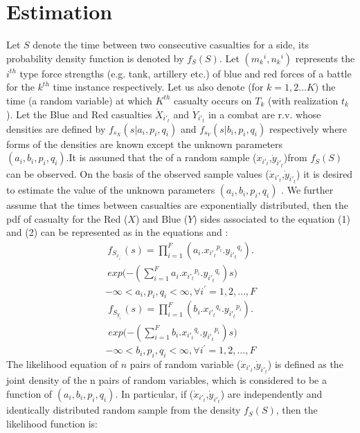 \documentclass[]{article}
\begin{document}
\section{Estimation}
Let $S$ denote the time between two consecutive casualties for a side, its probability density function is denoted by $f_S(S)$. Let $({m_k}^i,{n_k}^i)$  represents the ${i}^{th}$ type force strengths (e.g. tank, artillery etc.) of blue and red forces of a battle for the ${k}^{th}$ time instance respectively. Let us also denote (for $k=1,2\dots K$) the time (a random variable) at which $K^{th}$ casualty occurs on $T_k$ (with realization $t_k$). Let the Blue and Red casualties $\Dot{X}_{i'_t}$ and $\Dot{Y}_{i'_t}$  in a combat are r.v. whose densities are defined by $f_{s_X}(s | a_i,p_i,q_i)$  and  $f_{s_Y}(s | b_i,p_i,q_i)$ respectively where forms of the densities are known except the unknown parameters \\$(a_i,b_i,p_i,q_i)$.It is assumed that the   of a random sample  ($\Dot{x}_{i'_t}$,$\Dot{y}_{i'_t}$)from $f_S(S)$ can be observed. On the basis of the observed sample values ($\Dot{x}_{i'_t}$,$\Dot{y}_{i'_t}$) it is desired to estimate the value of the unknown parameters $(a_i,b_i,p_i,q_i)$ . We further assume that the times between casualties are exponentially distributed, then the pdf  of casualty for the Red ($X$) and Blue ($Y$) sides associated to the equation (1) and (2) can be represented as in the equations  and :
\begin{multline*}
     f_{S_{{x}_{i^{'}}}}(s)=
     {\prod_{i=1}^{F}}(a_i.{x_{i'_t}}^{p_i}.{y_{i'_t}}^{q_i}).
     \\exp(-{(\sum_{i=1}^{F}a_i.{x_{i'_t}}^{p_i}.{y_{i'_t}}^{q_i})s)} \nonumber
     \end{multline*}
\begin{equation}\label{e3}
    -\infty<a_i,p_i,q_i<\infty,  \forall{i^{'}=1,2,\dots,F}
\end{equation}
\begin{multline*}\label{e4}
     f_{S_{{y}_{i^{'}}}}(s)=
     {\prod_{i=1}^{F}}(b_i.{x_{i'_t}}^{q_i}.{y_{i'_t}}^{p_i}).
     \\exp(-{(\sum_{i=1}^{F}b_i.{x_{i'_t}}^{q_i}.{y_{i'_t}}^{p_i})s)} \nonumber
     \end{multline*}
\begin{equation}\label{e5}
    -\infty<b_i,p_i,q_i<\infty,  \forall{i^{'}=1,2,\dots,F}
\end{equation}
The likelihood equation of $n$ pairs of random variable ($\Dot{x}_{i'_t}$,$\Dot{y}_{i'_t}$) is defined as the joint density of the n pairs of random variables, which is considered to be a function of $(a_i,b_i,p_i,q_i)$. In particular, if ($\Dot{x}_{i'_t}$,$\Dot{y}_{i'_t}$) are independently and identically distributed random sample from the density $f_S(S)$, then the likelihood function is:  
 
\end{document}
